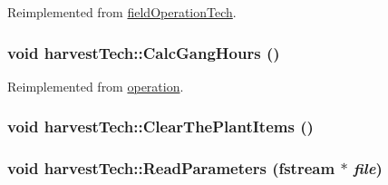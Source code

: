 Reimplemented from \hyperlink{classfield_operation_tech_a530d49b4cf06668121b80eba679b7e98}{fieldOperationTech}.\hypertarget{classharvest_tech_a76ab6bbf21dabdf2dccc36bb5a632f9e}{
\subsubsection[{CalcGangHours}]{\setlength{\rightskip}{0pt plus 5cm}void harvestTech::CalcGangHours ()}}
\label{classharvest_tech_a76ab6bbf21dabdf2dccc36bb5a632f9e}


Reimplemented from \hyperlink{classoperation_a51c5612f29519bc82050ffccf089bc07}{operation}.\hypertarget{classharvest_tech_ab48c8055972115e18263492081374a09}{
\subsubsection[{ClearThePlantItems}]{\setlength{\rightskip}{0pt plus 5cm}void harvestTech::ClearThePlantItems ()}}
\label{classharvest_tech_ab48c8055972115e18263492081374a09}
\hypertarget{classharvest_tech_a8b2a5efa11d4ee3355c75cec9a080b27}{
\subsubsection[{ReadParameters}]{\setlength{\rightskip}{0pt plus 5cm}void harvestTech::ReadParameters (fstream $\ast$ {\em file})}}
\label{classharvest_tech_a8b2a5efa11d4ee3355c75cec9a080b27}


